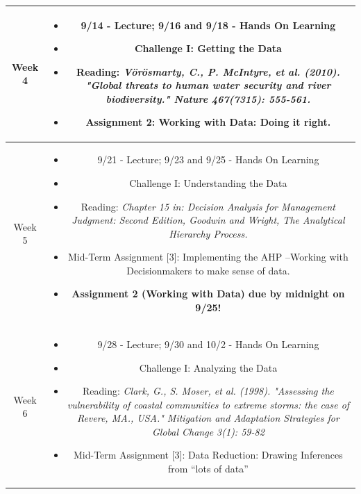 \documentclass[11pt]{article}
\begin{document}
\begin{table}[h!]
\begin{tabular}{ | c | c | }
Week 4 & \begin{minipage}{.85\textwidth}
\begin{itemize} \itemsep-0.4em
	\vspace{1mm}
	\item 9/14 - Lecture; 9/16 and 9/18 - Hands On Learning
	\item Challenge I: Getting the Data  \item Reading: \textit{Vörösmarty, C., P. McIntyre, et al. (2010). "Global threats to human water security and river biodiversity." Nature 467(7315): 555-561.}
	\item Assignment 2: Working with Data: Doing it right.
	\vspace{1mm}
\end{itemize}
\end{minipage} \\
\hline

Week 5 & \begin{minipage}{.85\textwidth}
\begin{itemize} \itemsep-0.4em
	\vspace{1mm}
	\item 9/21 - Lecture; 9/23 and 9/25 - Hands On Learning
	\item Challenge I: Understanding the Data \item Reading: \textit{Chapter 15 in: Decision Analysis for Management Judgment: Second Edition, Goodwin and Wright, The Analytical Hierarchy Process.}
	\item Mid-Term Assignment [3]: Implementing the AHP –Working with Decisionmakers to make sense of data.
	\item \textbf{Assignment 2 (Working with Data) due by midnight on 9/25!}
	\vspace{1mm}
\end{itemize}
\end{minipage} \\
\hline


Week 6 & \begin{minipage}{.85\textwidth}
\begin{itemize} \itemsep-0.4em
	\vspace{1mm}
	\item 9/28 - Lecture; 9/30 and 10/2 - Hands On Learning
	\item Challenge I: Analyzing the Data 
	\item Reading: \textit{Clark, G., S. Moser, et al. (1998). "Assessing the vulnerability of coastal communities to extreme  storms: the case of Revere, MA., USA." Mitigation and Adaptation 
Strategies for Global Change 3(1): 59-82}
	\item Mid-Term Assignment [3]: Data Reduction: Drawing Inferences from “lots of data”
	\vspace{1mm}
\end{itemize}
\end{minipage} \\
\hline


\end{tabular}
\end{table}
\end{document}
